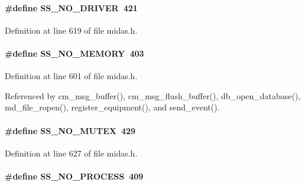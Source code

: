 \paragraph[{SS\_\-NO\_\-DRIVER}]{\setlength{\rightskip}{0pt plus 5cm}\#define SS\_\-NO\_\-DRIVER~421}\hfill\label{group__err24_ga6d231194f11fe80cf351cab940212ead}

\begin{DoxyItemize}
\item 
\end{DoxyItemize}

Definition at line 619 of file midas.h.
\paragraph[{SS\_\-NO\_\-MEMORY}]{\setlength{\rightskip}{0pt plus 5cm}\#define SS\_\-NO\_\-MEMORY~403}\hfill\label{group__err24_ga39da075b89b283b1ba6ee8163cd75e6d}

\begin{DoxyItemize}
\item 
\end{DoxyItemize}

Definition at line 601 of file midas.h.

Referenced by cm\_\-msg\_\-buffer(), cm\_\-msg\_\-flush\_\-buffer(), db\_\-open\_\-database(), md\_\-file\_\-ropen(), register\_\-equipment(), and send\_\-event().
\paragraph[{SS\_\-NO\_\-MUTEX}]{\setlength{\rightskip}{0pt plus 5cm}\#define SS\_\-NO\_\-MUTEX~429}\hfill\label{group__err24_ga12b0dd329283f2b865476ce4d3e1fcb3}

\begin{DoxyItemize}
\item 
\end{DoxyItemize}

Definition at line 627 of file midas.h.
\paragraph[{SS\_\-NO\_\-PROCESS}]{\setlength{\rightskip}{0pt plus 5cm}\#define SS\_\-NO\_\-PROCESS~409}\hfill\label{group__err24_ga45a5e45d0c1bb8ac8b23385a95ffd20d}

